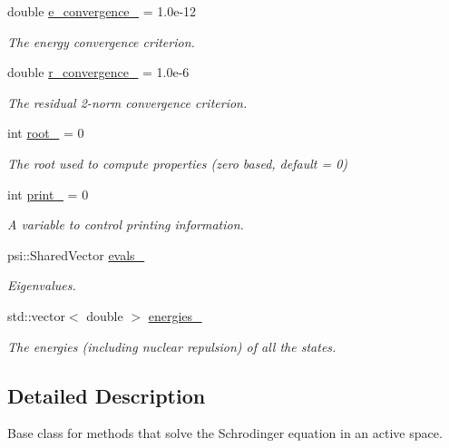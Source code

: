 \begin{DoxyCompactItemize}
\item 
double \mbox{\hyperlink{classforte_1_1_active_space_method_aabde020cf2dee6ccee213f0a3e364327}{e\+\_\+convergence\+\_\+}} = 1.\+0e-\/12
\begin{DoxyCompactList}\small\item\em The energy convergence criterion. \end{DoxyCompactList}\item 
double \mbox{\hyperlink{classforte_1_1_active_space_method_a78d130a7a72dede5a9908218fbb968e1}{r\+\_\+convergence\+\_\+}} = 1.\+0e-\/6
\begin{DoxyCompactList}\small\item\em The residual 2-\/norm convergence criterion. \end{DoxyCompactList}\item 
int \mbox{\hyperlink{classforte_1_1_active_space_method_a53458a01013f2953a6d1f9f7ffaf7748}{root\+\_\+}} = 0
\begin{DoxyCompactList}\small\item\em The root used to compute properties (zero based, default = 0) \end{DoxyCompactList}\item 
int \mbox{\hyperlink{classforte_1_1_active_space_method_aad045907e17a8a42f293d50315586eb2}{print\+\_\+}} = 0
\begin{DoxyCompactList}\small\item\em A variable to control printing information. \end{DoxyCompactList}\item 
psi\+::\+Shared\+Vector \mbox{\hyperlink{classforte_1_1_active_space_method_a22e878923ad570612cf05674f339c0ca}{evals\+\_\+}}
\begin{DoxyCompactList}\small\item\em Eigenvalues. \end{DoxyCompactList}\item 
std\+::vector$<$ double $>$ \mbox{\hyperlink{classforte_1_1_active_space_method_a9dad8dec653d25bab4c7a6a9c2293e12}{energies\+\_\+}}
\begin{DoxyCompactList}\small\item\em The energies (including nuclear repulsion) of all the states. \end{DoxyCompactList}\end{DoxyCompactItemize}


\subsection{Detailed Description}
Base class for methods that solve the Schrodinger equation in an active space. 

